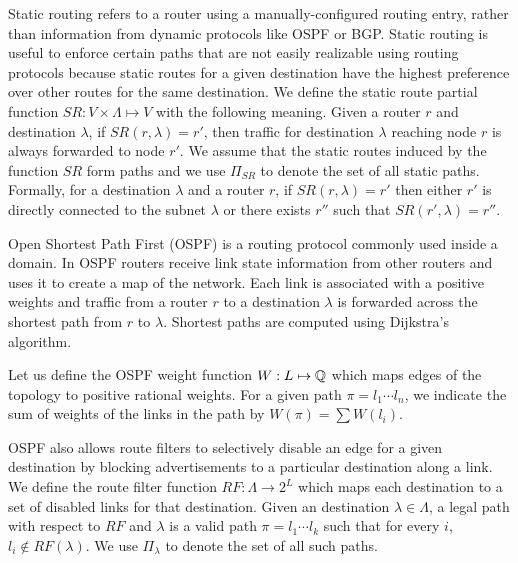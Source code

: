  Static routing refers to a router using a
manually-configured routing entry, rather than information from
dynamic protocols like OSPF or BGP.  Static routing is useful to enforce certain
paths that are not easily realizable using routing protocols because 
static
routes for a given destination have the highest preference over other routes for the same
destination.  
We define the static route partial
function $SR: V \times \Lambda \mapsto V$ with the following meaning. 
Given a router $r$
and destination $\lambda$, if $SR(r,\lambda)=r'$, then traffic for
destination $\lambda$ reaching node $r$ is always forwarded to node
$r'$. We assume that  the static routes induced by the function $SR$ form paths and
we use $\Pi_{SR}$ to denote the set of all  static paths. 
Formally, for a destination $\lambda$ and a router $r$, if $SR(r,\lambda)=r'$ then
either $r'$ is directly connected to the subnet $\lambda$ or there exists $r''$ such that $SR(r',\lambda)=r''$.


 Open Shortest Path First (OSPF) is a routing
protocol commonly used inside a domain. In OSPF routers receive link
state information from other routers and uses it to create a map of
the network. Each link is associated with a positive weights and traffic from a router $r$ to
a destination $\lambda$ is forwarded across the shortest path from $r$ to $\lambda$.
Shortest paths are computed using Dijkstra's algorithm.

Let us
define the OSPF weight function $W: L \mapsto \mathbb{Q}$ which 
maps edges of the topology to positive rational weights. 
For a given
path $\pi=l_1\cdots l_n$, we indicate the sum of weights of the
links in the path by $W(\pi)=\sum W(l_i)$. 


OSPF also allows  route filters
to selectively disable an
edge for a given destination by  
blocking advertisements to a
particular destination along a link. 
We define the  route filter function 
$RF: \Lambda \rightarrow 2^L$ which maps each destination  
to a set of disabled links for that destination. 
Given an   destination $\lambda\in \Lambda$, 
a legal path with respect to $RF$ and $\lambda$
is a valid path $\pi=l_1\cdots l_k$ such that for every $i$,
$l_i\not\in RF(\lambda)$.
We use $\Pi_\lambda$ to denote the set of all such paths.

